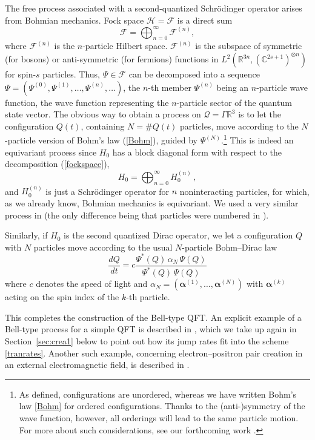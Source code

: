 \documentclass[12pt]{article}
\newcommand{\CCC}{\mathbb{C}} %
\newcommand{\RRR}{\mathbb{R}} %
\newcommand{\1}{\mathbf{1}} %
\newcommand{\Hilbert}{\mathscr{H}}
\newcommand{\Fock}{\mathscr{F}} %
\newcommand{\conf}{\mathcal{Q}} %
\newcommand{\valpha}{{\boldsymbol \alpha}}
\begin{document}
The free process associated with a second-quantized Schr\"odinger
operator arises from Bohmian mechanics.  Fock space $\Hilbert = \Fock$
is a direct sum
\begin{equation}\label{fockspace}
  \Fock= \bigoplus_{n=0}^{\infty} \Fock^{(n)} ,
\end{equation}
where $\Fock^{(n)}$ is the $n$-particle Hilbert space.  $\Fock^{(n)}$
is the subspace of symmetric (for bosons) or anti-symmetric (for
fermions) functions in $L^2 (\RRR^{3n}, (\CCC^{2s+1})^{\otimes n})$
for spin-$s$ particles. Thus, $\Psi \in \Fock$ can be decomposed into
a sequence $\Psi = \left( \Psi^{(0)}, \Psi^{(1)}, \ldots, \Psi^{(n)},
\ldots \right)$, the $n$-th member $\Psi^{(n)}$ being an $n$-particle
wave function, the wave function representing the $n$-particle sector
of the quantum state vector.  The obvious way to obtain a process on
$\conf = \Gamma \RRR^3$ is to let the configuration $Q(t)$, containing
$N = \#Q(t)$ particles, move according to the $N$-particle version of
Bohm's law (\ref{Bohm}), guided by $\Psi^{(N)}$.\footnote{As defined,
configurations are unordered, whereas we have written Bohm's law
\eqref{Bohm} for ordered configurations.  Thanks to the
(anti\nobreakdash-)symmetry of the wave function, however, all
orderings will lead to the same particle motion. For more about such
considerations, see our forthcoming work \cite{identical}.}  This is
indeed an equivariant process since $H_0$ has a block diagonal form
with respect to the decomposition (\ref{fockspace}),
\[
  H_0 = \bigoplus_{n=0}^\infty H_0^{(n)}\,,
\]
and $H_0^{(n)}$ is just a Schr\"odinger operator for $n$
noninteracting particles, for which, as we already know, Bohmian
mechanics is equivariant.  We used a very similar process in
\cite{crea1} (the only difference being that particles were numbered
in \cite{crea1}).

Similarly, if $H_0$ is the second quantized Dirac operator, we let a
configuration $Q$ with $N$ particles move according to the usual
$N$-particle Bohm--Dirac law \cite[p.~274]{BH}
\begin{equation}\label{BohmDirac}
  \frac{dQ}{dt} = c\frac{\Psi^*(Q) \, \alpha_{N} \, \Psi(Q)}
  {\Psi^*(Q) \, \Psi(Q)}
\end{equation}
where $c$ denotes the speed of light and $\alpha_{N} = (\valpha^{(1)},
\ldots, \valpha^{(N)})$ with $\valpha^{(k)}$ acting on the spin index
of the $k$-th particle.

This completes the construction of the Bell-type QFT. An explicit
example of a Bell-type process for a simple QFT is described in
\cite{crea1}, which we take up again in Section~\ref{sec:crea1} below
to point out how its jump rates fit into the scheme
\eqref{tranrates}. Another such example, concerning electron--positron
pair creation in an external electromagnetic field, is described in
\cite[Sec.~3.3.]{crea2B}.
\end{document}
